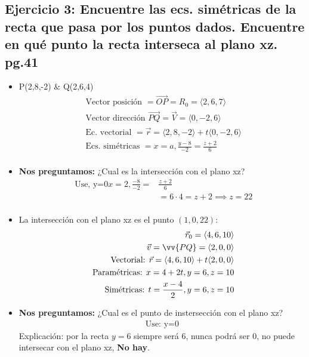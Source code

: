 \documentclass{article}
\begin{document}
\subsection{Ejercicio 3: Encuentre las ecs. simétricas de la recta que pasa por los puntos dados. Encuentre en qué punto la recta interseca al plano xz. pg.41}
\begin{itemize}
    \item P(2,8,-2) \& Q(2,6,4) 
    \begin{align*}
        \text{  Vector posición  } = \overrightarrow{OP} = R_0 = \langle 2,6,7 \rangle \\ 
        \text{  Vector dirección  } \overrightarrow{PQ} = \vec{V} = \langle 0,-2,6 \rangle \\ 
        \text{  Ec. vectorial  } = \vec{r} = \langle 2,8,-2 \rangle + t \langle 0,-2,6 \rangle \\
        \text{  Ecs. simétricas  } = x = a, \frac{y-8}{-2} = \frac{z+2}{6} \\   
    \end{align*}
    
    \item \textbf{Nos preguntamos:} ¿Cual es la intersección con el plano xz?
    \begin{align*}
        \text{  Use,  y=0} x = 2, \frac{-8}{-2} =&  \frac{z+2}{6} \\ 
        & = 6 \cdot 4 = z+ 2 \implies z= 22 \\ 
    \end{align*}

    
    \item La intersección con el plano xz es el punto $(1,0,22)$: 
    \begin{align*}
        \vec{r}_0 = \langle 4,6,10 \rangle \\ 
        \vec{v} = \vv{PQ} = \langle 2,0,0 \rangle \\ 
        \text{  Vectorial:    } \vec{r} = \langle 4,6,10 \rangle + t \langle 2,0,0 \rangle \\ 
        \text{  Paramétricas: } x = 4 + 2t, y = 6, z = 10 \\ 
        \text{  Simétricas:  }t = \frac{x-4}{2} , y = 6, z=10 \\  
    \end{align*}
    
    \item \textbf{Nos preguntamos:} ¿Cual es el punto de instersección con el plano xz?
    \begin{align*}
        \text{  Use: y=0  }
    \end{align*}
    Explicación: por la recta $y=6$ siempre será 6, nunca podrá ser $0$, no puede intersecar con el plano xz, \textbf{No hay}.
\end{itemize}
\end{document}
